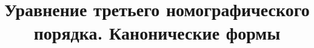 \documentclass[a4paper]{scrartcl}
\begin{document}
\title{Уравнение третьего номографического порядка. Канонические формы}

\stealcurrent
\end{document}
